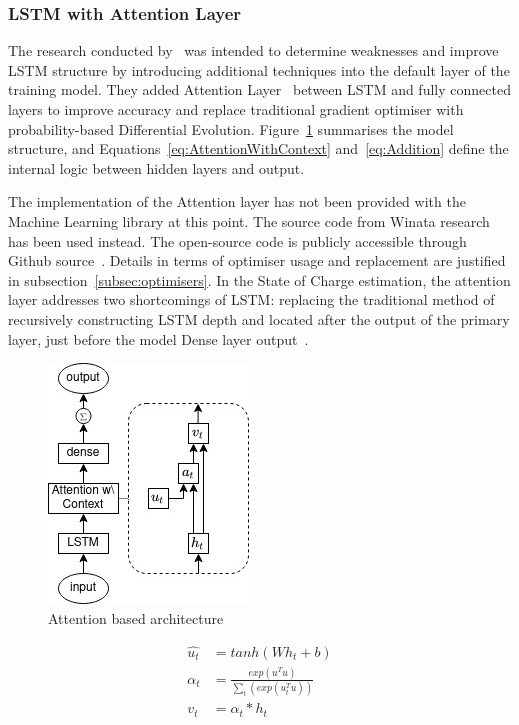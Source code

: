 \subsubsection{LSTM with Attention Layer}
The research conducted by~\cite{mamo_long_2020} was intended to determine weaknesses and improve LSTM structure by introducing additional techniques into the default layer of the training model. 
They added Attention Layer~\cite{yang_hierarchical_2016} between LSTM and fully connected layers to improve accuracy and replace traditional gradient optimiser with probability-based Differential Evolution.
\mbox{Figure~\ref{fig:attention}} summarises the model structure, and \mbox{Equations~\ref{eq:AttentionWithContext}} and~\ref{eq:Addition} define the internal logic between hidden layers and output.

%
The implementation of the Attention layer has not been provided with the Machine Learning library at this point.
The source code from Winata research~\cite{winata_attention-based_2018} has been used instead.
The open-source code is publicly accessible through Github source~\cite{attention_8461990}.
Details in terms of optimiser usage and replacement are justified in subsection~\ref{subsec:optimisers}.
In the State of Charge estimation, the attention layer addresses two shortcomings of LSTM: replacing the traditional method of recursively constructing LSTM depth and located after the output of the primary layer, just before the model Dense layer output~\cite{mamo_long_2020}.
\begin{figure}[htbp]
    \centering
    \includegraphics[width=0.35\linewidth]{II_Body/LSTM/images/AttenrionDrawing.jpg}
    \caption{Attention based architecture}
    \label{fig:attention}
\end{figure}
\begin{equation}
    \begin{split}
        \hat{u_t} &= tanh \left(W h_{t} + b \right) \\
             \alpha_t &= \frac{exp(u^T u)}{\sum_t(exp(u_t^T u))} \\
              v_t &= \alpha_t*h_t%
    \end{split}
    \label{eq:AttentionWithContext}
\end{equation}
